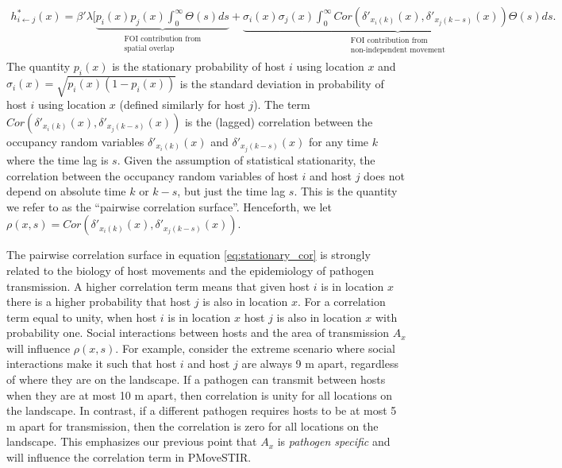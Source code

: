\documentclass[letterpaper]{article}
\begin{document}
\begin{equation}
    \begin{aligned}
    h^*_{i \leftarrow j}(x) = \beta' \lambda [ \underbrace{p_i(x)p_j(x) \int_0^{\infty} \Theta(s) ds}_{\substack{\text{FOI contribution from} \\ \text{spatial overlap}}} + \underbrace{\sigma_i(x) \sigma_j(x) \int_{0}^{\infty} Cor(\delta'_{x_i(k)}(x), \delta'_{x_j(k - s)}(x)) \Theta(s) ds}_{\substack{\text{FOI contribution from} \\ \text{non-independent movement}}}.
    \end{aligned}
    \label{eq:stationary_cor}
\end{equation}
The quantity $p_i(x)$ is the stationary probability of host $i$ using location $x$ and $\sigma_i(x) = \sqrt{p_i(x)(1 - p_i(x))}$ is the standard deviation in probability of host $i$ using location $x$ (defined similarly for host $j$). The term $Cor(\delta'_{x_i(k)}(x), \delta'_{x_j(k - s)}(x))$ is the (lagged) correlation between the occupancy random variables $\delta'_{x_i(k)}(x)$ and $\delta'_{x_j(k - s)}(x)$ for any time $k$ where the time lag is $s$.  Given the assumption of statistical stationarity, the correlation between the occupancy random variables of host $i$ and host $j$ does not depend on absolute time $k$ or $k - s$, but just the time lag $s$.   This is the quantity we refer to as the ``pairwise correlation surface''. Henceforth, we let $\rho(x ,s) = Cor(\delta'_{x_i(k)}(x), \delta'_{x_j(k - s)}(x))$. 

The pairwise correlation surface in equation \ref{eq:stationary_cor} is strongly related to the biology of host movements and the epidemiology of pathogen transmission.  A higher correlation term means that given host $i$ is in location $x$ there is a higher probability that host $j$ is also in location $x$.  For a correlation term equal to unity, when host $i$ is in location $x$ host $j$ is also in location $x$ with probability one.  Social interactions between hosts and the area of transmission $A_x$ will influence $\rho(x ,s)$.  For example, consider the extreme scenario where social interactions make it such that host $i$ and host $j$ are always 9 m apart, regardless of where they are on the landscape. If a pathogen can transmit between hosts when they are at most 10 m apart, then correlation is unity for all locations on the landscape. In contrast, if a different pathogen requires hosts to be at most 5 m apart for transmission, then the correlation is zero for all locations on the landscape. This emphasizes our previous point that $A_x$ is \emph{pathogen specific} and will influence the correlation term in PMoveSTIR.
\end{document}
